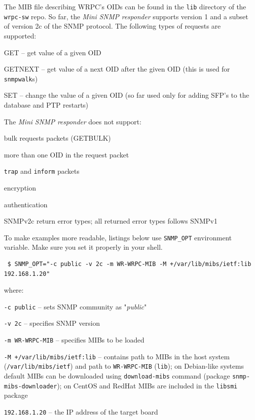 \documentclass[a4paper, 12pt]{article}
\begin{document}
The MIB file describing WRPC's OIDs can be found in the \texttt{lib} directory
of the \texttt{wrpc-sw} repo.
So far, the \textit{Mini SNMP responder} supports version 1 and a subset of version
2c of the SNMP protocol.
The following types of requests are supported:
\begin{itemize*}
   \item GET -- get value of a given OID
   \item GETNEXT -- get value of a next OID after the given OID (this is used
         for \texttt{snmpwalk}s)
   \item SET -- change the value of a given OID (so far used only for adding
         SFP's to the database and PTP restarts)
\end{itemize*}
The \textit{Mini SNMP responder} does not support:
\begin{itemize*}
   \item bulk requests packets (GETBULK)
   \item more than one OID in the request packet
   \item \texttt{trap} and \texttt{inform} packets
   \item encryption
   \item authentication
   \item SNMPv2c return error types; all returned error types follows SNMPv1
\end{itemize*}
To make examples more readable, listings below use \texttt{SNMP\_OPT} environment
variable. Make sure you set it properly in your shell.
\begin{lstlisting}
 $ SNMP_OPT="-c public -v 2c -m WR-WRPC-MIB -M +/var/lib/mibs/ietf:lib 192.168.1.20"
\end{lstlisting}
where:
\begin{sloppypar} %
\begin{itemize*}
   \item \texttt{-c public} -- sets SNMP community as "\textit{public}"
   \item \texttt{-v 2c} -- specifies SNMP version
   \item \texttt{-m WR-WRPC-MIB} -- specifies MIBs to be loaded
   \item \texttt{-M +/var/lib/mibs/ietf:lib} -- contains path to MIBs in the host
         system (\texttt{/var/lib/mibs/ietf}) and path to \texttt{WR-WRPC-MIB} (\texttt{lib});
         on Debian-like systems default MIBs can be downloaded using
         \texttt{download-mibs} command (package \texttt{snmp-mibs-downloader}); on
         CentOS and RedHat MIBs are included in the \texttt{libsmi} package
   \item \texttt{192.168.1.20} -- the IP address of the target board
\end{itemize*}\end{sloppypar}\noindent
\end{document}

